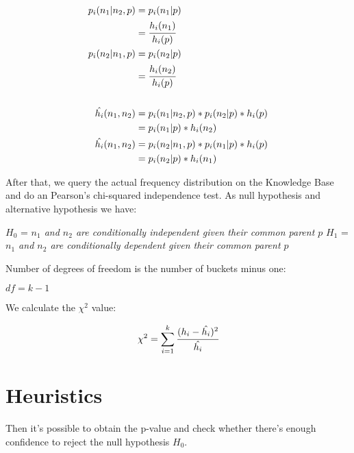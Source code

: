 \begin{equation}
\begin{split}
 p_i(n_1|n_2,p) &= p_i(n_1|p) \\ 
 &= \cfrac{h_i(n_1)}{h_i(p)} \\ 
 p_i(n_2|n_1,p) &= p_i(n_2|p) \\ 
 &= \cfrac{h_i(n_2)}{h_i(p)} \\ \\ 
 \hat{h_i}(n_1,n_2) &= p_i(n_1|n_2,p)*p_i(n_2|p)*h_i(p) \\ 
 &= p_i(n_1|p)*h_i(n_2) \\ 
 \hat{h_i}(n_1,n_2) &= p_i(n_2|n_1,p)*p_i(n_1|p)*h_i(p) \\ 
 &= p_i(n_2|p)*h_i(n_1) 
\end{split}
\end{equation}

After that, we query the actual frequency distribution on the Knowledge Base and do an Pearson's chi-squared independence test. As null hypothesis and alternative hypothesis we have:

\begin{center}
  $H_0$ = \emph{$n_1$ and $n_2$ are conditionally independent given their common parent $p$} 
  $H_1$ = \emph{$n_1$ and $n_2$ are conditionally dependent given their common parent $p$} 
\end{center}

Number of degrees of freedom is the number of buckets minus one:

\begin{center}
 $df=k-1$
\end{center}

We calculate the $\chi^2$ value:

\begin{equation}
 \chi^2=\sum_{i=1}^{k} \cfrac{(h_i - \hat{h_i})^2}{\hat{h_i}}
\end{equation}

\cite{Jaroszewicz02pruningredundant}

\section{Heuristics}

Then it's possible to obtain the p-value and check whether there's enough confidence to reject the null hypothesis $H_0$.

